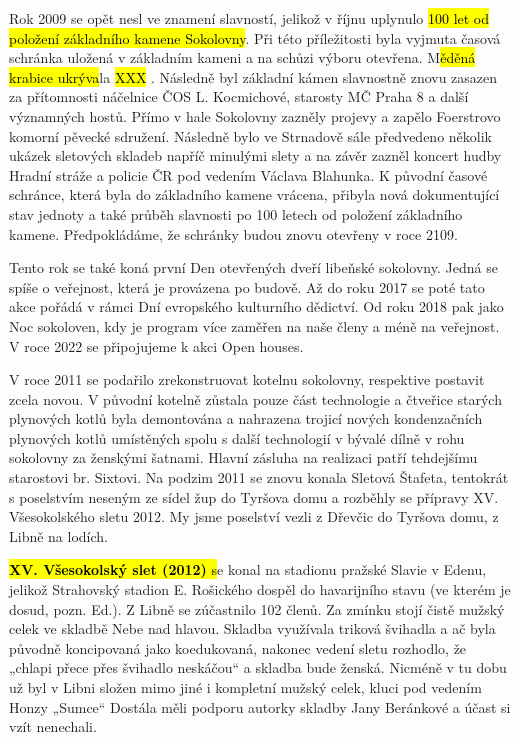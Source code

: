 Rok 2009 se opět nesl ve znamení slavností, jelikož v říjnu uplynulo
\hl{100 let od položení základního kamene Sokolovny}. Při této
příležitosti byla vyjmuta časová schránka uložená v základním kameni a
na schůzi výboru otevřena. M\hl{ěděná krabice ukrýva}la \hl{XXX} .
Následně byl základní kámen slavnostně znovu zasazen za přítomnosti
náčelnice ČOS L. Kocmichové, starosty MČ Praha 8 a další významných
hostů. Přímo v hale Sokolovny zazněly projevy a zapělo Foerstrovo
komorní pěvecké sdružení. Následně bylo ve Strnadově sále předvedeno
několik ukázek sletových skladeb napříč minulými slety a na závěr zazněl
koncert hudby Hradní stráže a policie ČR pod vedením Václava Blahunka. K
původní časové schránce, která byla do základního kamene vrácena,
přibyla nová dokumentující stav jednoty a také průběh slavnosti po 100
letech od položení základního kamene. Předpokládáme, že schránky budou
znovu otevřeny v roce 2109.

Tento rok se také koná první Den otevřených dveří libeňské sokolovny.
Jedná se spíše o veřejnost, která je provázena po budově. Až do roku
2017 se poté tato akce pořádá v rámci Dní evropského kulturního
dědictví. Od roku 2018 pak jako Noc sokoloven, kdy je program více
zaměřen na naše členy a méně na veřejnost. V roce 2022 se připojujeme k
akci Open houses.

V roce 2011 se podařilo zrekonstruovat kotelnu sokolovny, respektive
postavit zcela novou. V původní kotelně zůstala pouze část technologie a
čtveřice starých plynových kotlů byla demontována a nahrazena trojicí
nových kondenzačních plynových kotlů umístěných spolu s další
technologií v bývalé dílně v rohu sokolovny za ženskými šatnami. Hlavní
zásluha na realizaci patří tehdejšímu starostovi br. Sixtovi. Na podzim
2011 se znovu konala Sletová Štafeta, tentokrát s poselstvím neseným ze
sídel žup do Tyršova domu a rozběhly se přípravy XV. Všesokolského sletu
2012. My jsme poselství vezli z Dřevčic do Tyršova domu, z Libně na
lodích.

\hl{\textbf{XV. Všesokolský slet (2012)} s}e konal na stadionu pražské
Slavie v Edenu, jelikož Strahovský stadion E. Rošického dospěl do
havarijního stavu (ve kterém je dosud, pozn. Ed.). Z Libně se zúčastnilo
102 členů. Za zmínku stojí čistě mužský celek ve skladbě Nebe nad
hlavou. Skladba využívala triková švihadla a ač byla původně koncipovaná
jako koedukovaná, nakonec vedení sletu rozhodlo, že „chlapi přece přes
švihadlo neskáčou`` a skladba bude ženská. Nicméně v tu dobu už byl v
Libni složen mimo jiné i kompletní mužský celek, kluci pod vedením Honzy
„Sumce`` Dostála měli podporu autorky skladby Jany Beránkové a účast si
vzít nenechali.


